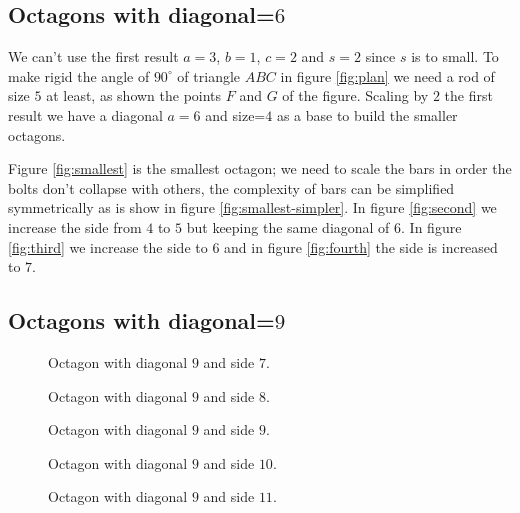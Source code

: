 \documentclass[11pt]{article}
\begin{document}
\subsection{Octagons with diagonal=$6$}

We can't use the first result $a=3$, $b=1$, $c=2$ and $s=2$ since $s$ is to small. To make rigid the angle of $90^\circ{}$ of triangle $ABC$ in figure \ref{fig:plan} we need a rod of size $5$ at least, as shown the points $F$ and $G$ of the figure.
Scaling by $2$ the first result we have a diagonal $a=6$ and size=$4$ 
as a base to build the smaller octagons.

Figure \ref{fig:smallest} is the smallest octagon; we need to scale the bars in order
the bolts don't collapse with others, the complexity of bars can be simplified 
symmetrically as is show in figure \ref{fig:smallest-simpler}.
In figure \ref{fig:second} we increase the side from $4$ to $5$ but keeping the same diagonal of $6$. In figure \ref{fig:third} we increase the side to $6$ and in figure
\ref{fig:fourth} the side is increased to $7$.


\subsection{Octagons with diagonal=$9$}

\begin{figure}
\centering
{}
\caption{Octagon with diagonal $9$ and side $7$.}
\label{fig:9-7}
\end{figure}

\begin{figure}
\centering
{}
\caption{Octagon with diagonal $9$ and side $8$.}
\label{fig:9-8}
\end{figure}


\begin{figure}
\centering
{}
\caption{Octagon with diagonal $9$ and side $9$.}
\label{fig:9-9}
\end{figure}

\begin{figure}
\centering
{}
\caption{Octagon with diagonal $9$ and side $10$.}
\label{fig:9-10}
\end{figure}

\begin{figure}
\centering
{}
\caption{Octagon with diagonal $9$ and side $11$.}
\label{fig:9-11}
\end{figure}
\end{document}
